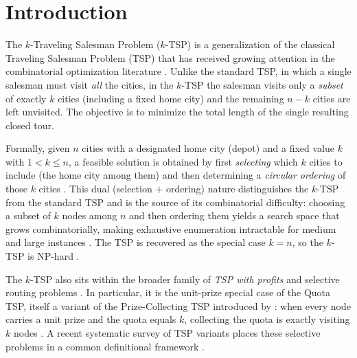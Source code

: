 
\section{Introduction}\label{sec:intro}

The $k$-Traveling Salesman Problem ($k$-TSP) is a generalization of the classical
Traveling Salesman Problem (TSP) that has received growing attention in the
combinatorial optimization literature \citep{venkatesh2018,pandiri2020,ene2017,blanchard2023}.
Unlike the standard TSP, in which a single salesman must visit \emph{all} the
cities, in the $k$-TSP the salesman visits only a \emph{subset} of exactly $k$
cities (including a fixed home city) and the remaining $n-k$ cities are left
unvisited. The objective is to minimize the total length of the single resulting
closed tour.

Formally, given $n$ cities with a designated home city (depot) and a fixed value
$k$ with $1 < k \le n$, a feasible solution is obtained by first \emph{selecting}
which $k$ cities to include (the home city among them) and then determining a
\emph{circular ordering} of those $k$ cities \citep{venkatesh2018}. This dual
(selection $+$ ordering) nature distinguishes the $k$-TSP from the standard TSP
and is the source of its combinatorial difficulty: choosing a subset of $k$ nodes
among $n$ and then ordering them yields a search space that grows combinatorially,
making exhaustive enumeration intractable for medium and large instances
\citep{lawler1985}. The TSP is recovered as the special case $k=n$, so the $k$-TSP
is NP-hard \citep{rego2011tsp}.

The $k$-TSP also sits within the broader family of \emph{TSP with profits} and
selective routing problems \citep{feillet2005profits}. In particular, it is the
unit-prize special case of the Quota TSP, itself a variant of the Prize-Collecting
TSP introduced by \citet{balas1989pctsp}: when every node carries a unit prize and
the quota equals $k$, collecting the quota is exactly visiting $k$ nodes
\citep{bienstock1993pctsp}. A recent systematic survey of TSP variants places these
selective problems in a common definitional framework \citep{tspt3co2025}.

